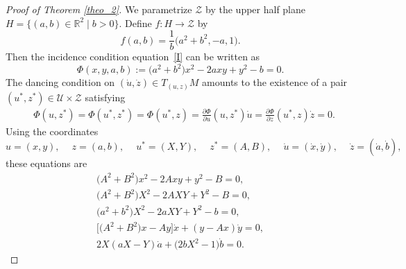 \documentclass[pdftex]{sigma}%
\numberwithin{equation}{section}
\newcommand{\Z}{\mathbb{Z}}
\newcommand{\R}{\mathbb{R}}
\def\be{\begin{equation}}
\def\ee{\end{equation}}
\renewcommand{\Z}{\mathcal{Z}}
\newcommand{\U}{\mathcal{U}}
\newcommand{\st}{\mid }
\begin{document}
\begin{proof}[Proof of Theorem \ref{theo_2}]
We parametrize $\Z$ by the upper half
plane
$H=\big\{(a,b)\in\R^2\st b>0\big\}$. Define $f\colon H\to\Z$ by
\[
f(a,b)=\frac{1}{b}\big(a^2+b^2, -a, 1\big).
\]
Then the incidence condition equation~\eqref{I} can be written as
\be\label{U}
\Phi(x,y,a,b):=\big(a^2+b^2\big)x^2 -2 a x y+y^2-b=0.
\ee
The dancing condition on $(\dot u, \dot z)\in T_{(u,z)}M$
amounts to the existence of a pair $(u^*, z^*)\in\U\times\Z$ satisfying
\begin{align}\label{cC}
&\Phi(u, z^* ) = \Phi(u^*,z^*)=\Phi(u^*,z )= \frac{\partial \Phi}{\partial u}(u,z^*)\dot u=
 \frac{\partial \Phi}{\partial z}(u^*,z)\dot z=0.
\end{align}
Using the coordinates
\[
u=(x,y),\quad\ z=(a,b),\quad\ u^*=(X,Y),\quad\ z^*=(A,B),\quad\ \dot u=(\dot x, \dot y),\quad\ \dot z=(\dot a, \dot b),
\]
these equations are
\begin{gather}
\big(A^2+B^2\big) x^2-2 A xy+y^2-B=0, \nonumber
\\
\big(A^2+B^2\big) X^2-2 A XY+Y^2-B=0, \nonumber
\\
\big(a^2+b^2\big) X^2-2 a XY +Y^2-b=0, \nonumber
\\
\big[\big(A^2+B^2\big) x- A y\big]\dot x+ ( y- A x)\dot y=0, \nonumber
\\
2X( a X- Y)\dot a+\big(2 b X^2-1\big)\dot b =0.\label{cCC}
 \end{gather}


\end{proof}
\end{document}
